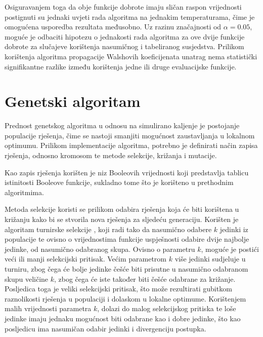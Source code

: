 Osiguravanjem toga da obje funkcije dobrote imaju sličan raspon vrijednosti postignuti su jednaki uvjeti rada algoritma na jednakim temperaturama, čime je omogućena usporedba rezultata međusobno.
Uz razinu značajnosti od $\alpha = 0.05$, moguće je odbaciti hipotezu o jednakosti rada algoritma za ove dvije funkcije dobrote za slučajeve korištenja nasumičnog i tabeliranog susjedstva.
Prilikom korištenja algoritma propagacije Walshovih koeficijenata unatrag nema statistički signifikantne razlike između korištenja jedne ili druge evaluacijske funkcije.

\section{Genetski algoritam}
Prednost genetskog algoritma u odnosu na simulirano kaljenje je postojanje populacije rješenja, čime se nastoji smanjiti mogućnost zaustavljanja u lokalnom optimumu.
Prilikom implementacije algoritma, potrebno je definirati način zapisa rješenja, odnosno kromosom te metode selekcije, križanja i mutacije.

Kao zapis rješenja korišten je niz Booleovih vrijednosti koji predstavlja tablicu istinitosti Booleove funkcije, sukladno tome što je korišteno u prethodnim algoritmima. 

Metoda selekcije koristi se prilikom odabira rješenja koja će biti korištena u križanju kako bi se stvorila nova rješenja za sljedeću generaciju.
Korišten je algoritam turnirske selekcije \cite{PrirodomInspirirani}, koji radi tako da nasumično odabere $k$ jedinki iz populacije te ovisno o vrijednostima funkcije uspješnosti odabire dvije najbolje jedinke, od nasumično odabranog skupa.
Ovisno o parametru $k$, moguće je postići veći ili manji selekcijski pritisak.
Većim parametrom $k$ više jedinki sudjeluje u turniru, zbog čega će bolje jedinke češće biti prisutne u nasumično odabranom skupu veličine $k$, zbog čega će iste također biti češće odabrane za križanje.
Posljedica toga je veliki selekcijski pritisak, što može rezultirati gubitkom raznolikosti rješenja u populaciji i dolaskom u lokalne optimume.
Korištenjem malih vrijednosti parametra $k$, dolazi do malog selekcijskog pritiska te loše jedinke imaju jednaku mogućnost biti odabrane kao i dobre jedinke, što kao posljedicu ima nasumičan odabir jedinki i divergenciju postupka.

